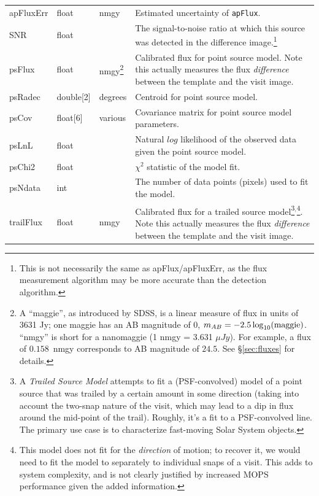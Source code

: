 \documentclass[12pt]{article}
\begin{document}
\begin{center}
\begin{longtable}{p{3cm}p{2cm}p{2cm}p{5cm}}
apFluxErr & float & nmgy &  Estimated uncertainty of \texttt{apFlux}. \\

SNR & float & ~ & The signal-to-noise ratio at which this source was detected in the difference image.\footnote{This is not necessarily the same as apFlux/apFluxErr, as the flux measurement algorithm may be more accurate than the detection algorithm.} \\

psFlux & float & nmgy\footnote{A ``maggie'', as introduced by SDSS, is a linear measure of flux in units of 3631 Jy; one maggie has an AB magnitude of 0, $m_{AB}=-2.5\log_{10}({\rm maggie})$. ``nmgy'' is short for a nanomaggie (1 nmgy = 3.631 $\mu Jy$). For example, a flux of $0.158$~nmgy corresponds to AB magnitude of $24.5$. See \S \ref{sec:fluxes} for details.} & Calibrated flux for point source model. Note this actually measures the flux {\em difference} between the template and the visit image. \\

psRadec & double[2] & degrees & Centroid for point source model. \\

psCov & float[6] & various & Covariance matrix for point source model parameters. \\

psLnL & float & ~ & Natural $log$ likelihood of the observed data given the point source model. \\

psChi2 & float & ~ & $\chi^2$ statistic of the model fit. \\

psNdata & int & ~ & The number of data points (pixels) used to fit the model. \\

trailFlux & float & nmgy & Calibrated flux for a trailed source model\footnote{A {\em Trailed Source Model} attempts to fit a (PSF-convolved) model of a point source that was trailed by a certain amount in some direction (taking into account the two-snap nature of the visit, which may lead to a dip in flux around the mid-point of the trail). Roughly, it's a fit to a PSF-convolved line. The primary use case is to characterize fast-moving Solar System objects.}$^,$\footnote{This model does not fit for the {\em direction} of motion; to recover it, we would need to fit the model to separately to individual snaps of a visit. This adds to system complexity, and is not clearly justified by increased MOPS performance given the added information.}. Note this actually measures the flux {\em difference} between the template and the visit image. \\


\end{longtable}
\end{center}
\end{document}

